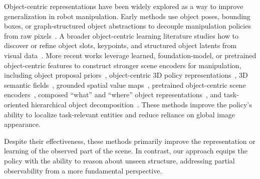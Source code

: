Object-centric representations have been widely explored as a way to improve generalization in robot manipulation. Early methods use object poses, bounding boxes, or graph-structured object abstractions to decouple manipulation policies from raw pixels~\cite{Sieb2020Graph,Wang2019Deep,Devin2018Deep,Tremblay2018Deep,Tyree20226Dof,Migimatsu2020Object}. A broader object-centric learning literature studies how to discover or refine object slots, keypoints, and structured object latents from visual data~\cite{Kipf2019ContrastiveLO,Greff2019MultiObjectRL,Engelcke2019GENESISGS,Kulkarni2019UnsupervisedLO,Locatello2020Object,Qian2022Discovering,Yuan2022Sornet,Bruno2023Unsupervised,Chang2022Object,Fan2023Unsupervised,Seitzer2023Bridging}. More recent works leverage learned, foundation-model, or pretrained object-centric features to construct stronger scene encoders for manipulation, including object proposal priors~\cite{zhu2022viola}, object-centric 3D policy representations~\cite{zhu2023learning}, 3D semantic fields~\cite{Wang2025GenDP}, grounded spatial value maps~\cite{Yang2025GravMAD}, pretrained object-centric scene encoders~\cite{Qian2024SOFT}, composed ``what'' and ``where'' object representations~\cite{Shi2024Composing}, and task-oriented hierarchical object decomposition~\cite{Qian2024Task}. These methods improve the policy's ability to localize task-relevant entities and reduce reliance on global image appearance.


Despite their effectiveness, these methods primarily improve the representation or learning of the observed part of the scene. In contrast, our approach equips the policy with the ability to reason about unseen structure, addressing partial observability from a more fundamental perspective.
